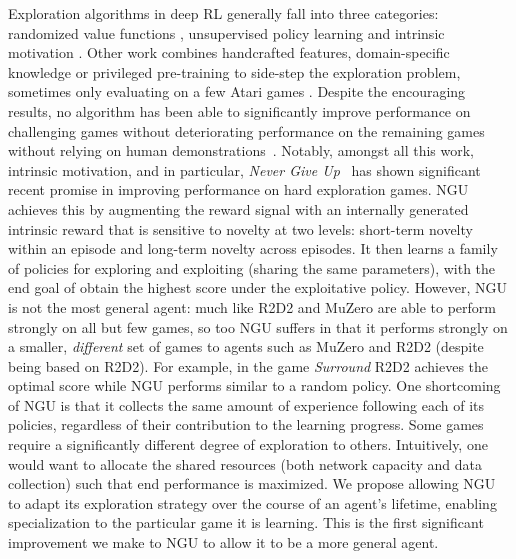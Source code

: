 \documentclass{article}
\begin{document}
Exploration algorithms in deep RL generally fall into three categories:
randomized value functions \citep{osband2016deep,fortunato2017noisy,salimans2017evolution,plappert2017parameter,osband2018randomized}, unsupervised policy learning \citep{gregor2016variational,achiam2018variational,eysenbach2018diversity} and intrinsic motivation \citep{schmidhuber1991possibility,oudeyer2007intrinsic,barto2013intrinsic,bellemare2016unifying,ostrovski2017count,fu2017ex2,tang2017exploration,burda2018exploration,choi2018contingency,savinov2018episodic, badia2020never}. Other work combines handcrafted features, domain-specific knowledge or privileged pre-training to side-step the exploration problem, sometimes only evaluating on a few Atari games \citep{aytar2018playing,ecoffet2019go}.
Despite the encouraging results, no algorithm has been able to significantly improve performance on challenging games without deteriorating performance on the remaining games without relying on human demonstrations~\citep{pohlen2018observe}.
Notably, amongst all this work, intrinsic motivation, and in particular, \textit{Never Give Up}~\citep[NGU; ][]{badia2020never} has shown significant recent promise in improving performance on hard exploration games.
NGU achieves this by augmenting the reward signal with an internally generated intrinsic reward that is sensitive to novelty at two levels: short-term novelty within an episode and long-term novelty across episodes.
It then learns a family of policies for exploring and exploiting (sharing the same parameters), with the end goal of obtain the highest score under the exploitative policy.
However, NGU is not the most general agent: much like R2D2 and MuZero are able to perform strongly on all but few games, so too NGU suffers in that it performs strongly on a smaller, \emph{different} set of games to agents such as MuZero and R2D2 (despite being based on R2D2).
For example, in the game  \textit{Surround} R2D2 achieves the optimal score while NGU performs similar to a random policy.
One shortcoming of NGU is that it collects the same amount of experience following each of its policies, regardless of their contribution to the learning progress.
Some games require a significantly different degree of exploration to others.
Intuitively, one would want to allocate the shared resources (both network capacity and data collection) such that end performance is maximized.
We propose allowing NGU to adapt its exploration strategy over the course of an agent's lifetime, enabling specialization to the particular game it is learning.
This is the first significant improvement we make to NGU to allow it to be a more general agent.
\end{document}
